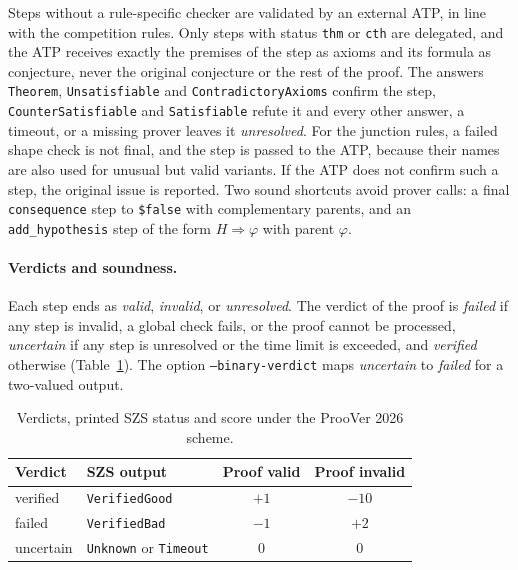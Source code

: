 Steps without a rule-specific checker are validated by an external ATP, in line with the competition rules.
Only steps with status \texttt{thm} or \texttt{cth} are delegated, and the ATP receives exactly the premises of the step as axioms and its formula as conjecture, never the original conjecture or the rest of the proof.
The answers \texttt{Theorem}, \texttt{Unsatisfiable} and \texttt{ContradictoryAxioms} confirm the step, \texttt{CounterSatisfiable} and \texttt{Satisfiable} refute it and every other answer, a timeout, or a missing prover leaves it \emph{unresolved}.
For the junction rules, a failed shape check is not final, and the step is passed to the ATP, because their names are also used for unusual but valid variants. If the ATP does not confirm such a step, the original issue is reported.
Two sound shortcuts avoid prover calls: a final \texttt{consequence} step to \texttt{\$false} with complementary parents, and an \texttt{add\_hypothesis} step of the form $H \Rightarrow \varphi$ with parent $\varphi$.

\paragraph{Verdicts and soundness.}
\label{subsec:design-verdict}

Each step ends as \emph{valid}, \emph{invalid}, or \emph{unresolved}.
The verdict of the proof is \emph{failed} if any step is invalid, a global check fails, or the proof cannot be processed, \emph{uncertain} if any step is unresolved or the time limit is exceeded, and \emph{verified} otherwise (Table~\ref{tab:verdicts}).
The option \texttt{--binary-verdict} maps \emph{uncertain} to \emph{failed} for a two-valued output.

\begin{table}[!htb]
\centering
\small
\caption{Verdicts, printed SZS status and score under the ProoVer 2026 scheme.}
\label{tab:verdicts}
\begin{tabular}{@{}l l c c@{}}
\toprule
Verdict & SZS output & Proof valid & Proof invalid \\
\midrule
verified & \texttt{VerifiedGood} & $+1$ & $-10$ \\
failed & \texttt{VerifiedBad} & $-1$ & $+2$ \\
uncertain & \texttt{Unknown} or \texttt{Timeout} & $0$ & $0$ \\
\bottomrule
\end{tabular}
\end{table}

